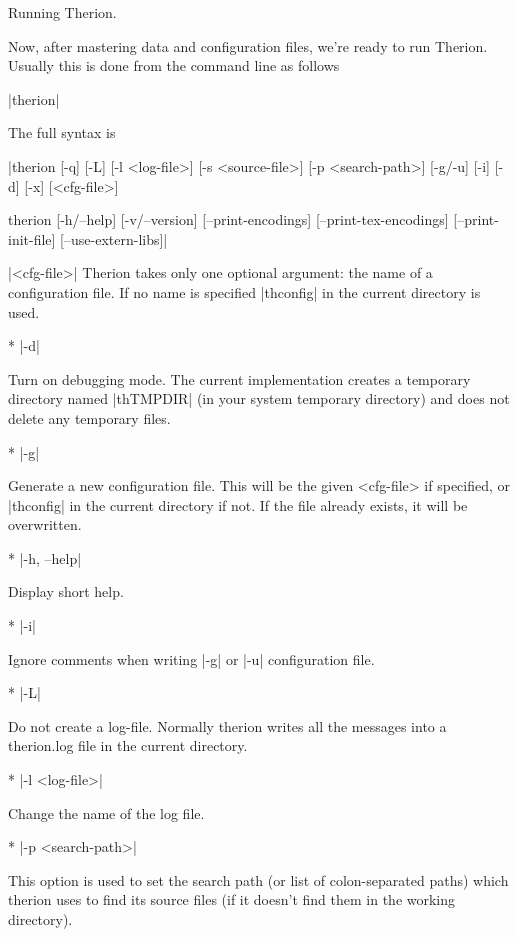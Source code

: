 \subchapter Running Therion.

Now, after mastering data and configuration files, we're ready to run Therion. 
Usually this is done from the command line as follows

|therion|

The full syntax is

|therion [-q] [-L] [-l <log-file>]
        [-s <source-file>] [-p <search-path>]
        [-g/-u] [-i] [-d] [-x] [<cfg-file>]

therion [-h/--help]
        [-v/--version]
        [--print-encodings]
        [--print-tex-encodings]
        [--print-init-file]
        [--use-extern-libs]|

\arguments
  |<cfg-file>| 
  Therion takes only one optional argument: the name of a configuration
  file. If no name is specified |thconfig| in the current directory is used. 
\endarguments

\options
* |-d|

  Turn on debugging mode. The current implementation creates a 
  temporary directory named |thTMPDIR| (in your system temporary 
  directory) and does not delete any temporary files. 

* |-g|

  Generate a new configuration file. This will be the given 
  <cfg-file> if specified, or |thconfig| in the current directory if not. 
  If the file already exists, it will be overwritten.
        
* |-h, --help|

        Display short help.

* |-i|

        Ignore comments when writing |-g| or |-u| configuration file.

* |-L|

        Do not create a log-file. Normally therion writes all the messages
        into a therion.log file in the current directory.
        
* |-l <log-file>|

        Change the name of the log file.
        
* |-p <search-path>|

        This option is used to set the search path (or list of 
	colon-separated paths) which therion uses to find its source
        files (if it doesn't find them in the working directory).

